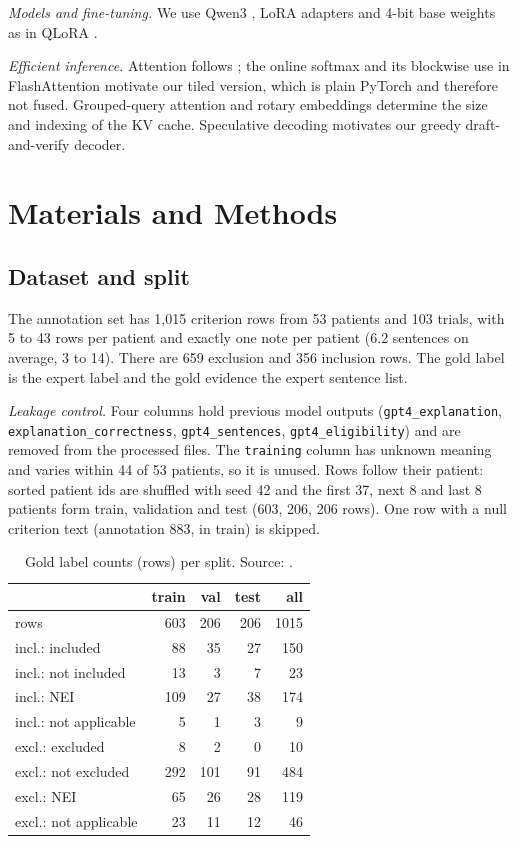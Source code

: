 \documentclass[conference]{IEEEtran}
\newcommand{\code}[1]{\texttt{#1}}
\begin{document}
\emph{Models and fine-tuning.} We use Qwen3 \cite{qwen3}, LoRA adapters \cite{lora} and 4-bit base weights as in QLoRA \cite{qlora}.

\emph{Efficient inference.} Attention follows \cite{vaswani}; the online softmax \cite{milakov} and its blockwise use in FlashAttention \cite{flashattention} motivate our tiled version, which is plain PyTorch and therefore not fused. Grouped-query attention \cite{gqa} and rotary embeddings \cite{rope} determine the size and indexing of the KV cache. Speculative decoding \cite{leviathan,chen2023} motivates our greedy draft-and-verify decoder. 

\section{Materials and Methods}
\subsection{Dataset and split}\label{sec:data}
The annotation set has 1,015 criterion rows from 53 patients and 103 trials, with 5 to 43 rows per patient and exactly one note per patient (6.2 sentences on average, 3 to 14). %
There are 659 exclusion and 356 inclusion rows. The gold label is the expert label and the gold evidence the expert sentence list.

\emph{Leakage control.} Four columns hold previous model outputs (\code{gpt4\_explanation}, \code{explanation\_correctness}, \code{gpt4\_sentences}, \code{gpt4\_eligibility}) and are removed from the processed files. The \code{training} column has unknown meaning and varies within 44 of 53 patients, so it is unused. %
Rows follow their patient: sorted patient ids are shuffled with seed 42 and the first 37, next 8 and last 8 patients form train, validation and test (603, 206, 206 rows). %
One row with a null criterion text (annotation 883, in train) is skipped.

\begin{table}[t]
\caption{Gold label counts (rows) per split. Source: \protect{}.}\label{tab:labels}
\centering\small\setlength{\tabcolsep}{4pt}
\begin{tabular}{lrrrr}
\toprule
 & train & val & test & all\\
\midrule
rows & 603 & 206 & 206 & 1015\\
incl.: included & 88 & 35 & 27 & 150\\
incl.: not included & 13 & 3 & 7 & 23\\
incl.: NEI & 109 & 27 & 38 & 174\\
incl.: not applicable & 5 & 1 & 3 & 9\\
excl.: excluded & 8 & 2 & 0 & 10\\
excl.: not excluded & 292 & 101 & 91 & 484\\
excl.: NEI & 65 & 26 & 28 & 119\\
excl.: not applicable & 23 & 11 & 12 & 46\\
\bottomrule
\end{tabular}
\end{table}
\end{document}
